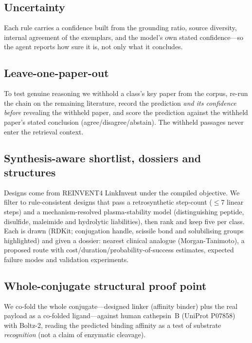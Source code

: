 \documentclass[10pt]{article}
\begin{document}
\subsection{Uncertainty}
Each rule carries a confidence built from the grounding ratio, source diversity, internal agreement of the exemplars, and the model's own stated confidence---so the agent reports how sure it is, not only what it concludes.

\subsection{Leave-one-paper-out}
To test genuine reasoning we withhold a class's key paper from the corpus, re-run the chain on the remaining literature, record the prediction \emph{and its confidence before} revealing the withheld paper, and score the prediction against the withheld paper's stated conclusion (agree/disagree/abstain). The withheld passages never enter the retrieval context.

\subsection{Synthesis-aware shortlist, dossiers and structures}
Designs come from REINVENT4 LinkInvent under the compiled objective. We filter to rule-consistent designs that pass a retrosynthetic step-count ($\le$7 linear steps) and a mechanism-resolved plasma-stability model (distinguishing peptide, disulfide, maleimide and hydrolytic liabilities), then rank and keep five per class. Each is drawn (RDKit; conjugation handle, scissile bond and solubilising groups highlighted) and given a dossier: nearest clinical analogue (Morgan-Tanimoto), a proposed route with cost/duration/probability-of-success estimates, expected failure modes and validation experiments.

\subsection{Whole-conjugate structural proof point}
We co-fold the whole conjugate---designed linker (affinity binder) plus the real payload as a co-folded ligand---against human cathepsin~B (UniProt P07858) with Boltz-2, reading the predicted binding affinity as a test of substrate \emph{recognition} (not a claim of enzymatic cleavage).
\end{document}
